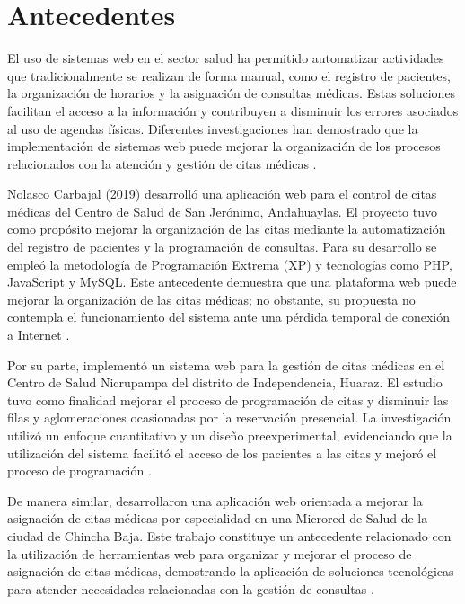 
\section{Antecedentes}

El uso de sistemas web en el sector salud ha permitido automatizar actividades que tradicionalmente se realizan de forma manual, como el registro de pacientes, la organización de horarios y la asignación de consultas médicas. Estas soluciones facilitan el acceso a la información y contribuyen a disminuir los errores asociados al uso de agendas físicas. Diferentes investigaciones han demostrado que la implementación de sistemas web puede mejorar la organización de los procesos relacionados con la atención y gestión de citas médicas \parencite{diaz2019,nolasco2019,herrera2021}.

Nolasco Carbajal (2019) desarrolló una aplicación web para el control de citas médicas del Centro de Salud de San Jerónimo, Andahuaylas. El proyecto tuvo como propósito mejorar la organización de las citas mediante la automatización del registro de pacientes y la programación de consultas. Para su desarrollo se empleó la metodología de Programación Extrema (XP) y tecnologías como PHP, JavaScript y MySQL. Este antecedente demuestra que una plataforma web puede mejorar la organización de las citas médicas; no obstante, su propuesta no contempla el funcionamiento del sistema ante una pérdida temporal de conexión a Internet \parencite{nolasco2019}.

Por su parte, \textcite{herrera2021} implementó un sistema web para la gestión de citas médicas en el Centro de Salud Nicrupampa del distrito de Independencia, Huaraz. El estudio tuvo como finalidad mejorar el proceso de programación de citas y disminuir las filas y aglomeraciones ocasionadas por la reservación presencial. La investigación utilizó un enfoque cuantitativo y un diseño preexperimental, evidenciando que la utilización del sistema facilitó el acceso de los pacientes a las citas y mejoró el proceso de programación \parencite{herrera2021}.

De manera similar, \textcite{mera2022} desarrollaron una aplicación web orientada a mejorar la asignación de citas médicas por especialidad en una Microred de Salud de la ciudad de Chincha Baja. Este trabajo constituye un antecedente relacionado con la utilización de herramientas web para organizar y mejorar el proceso de asignación de citas médicas, demostrando la aplicación de soluciones tecnológicas para atender necesidades relacionadas con la gestión de consultas \parencite{mera2022}.

